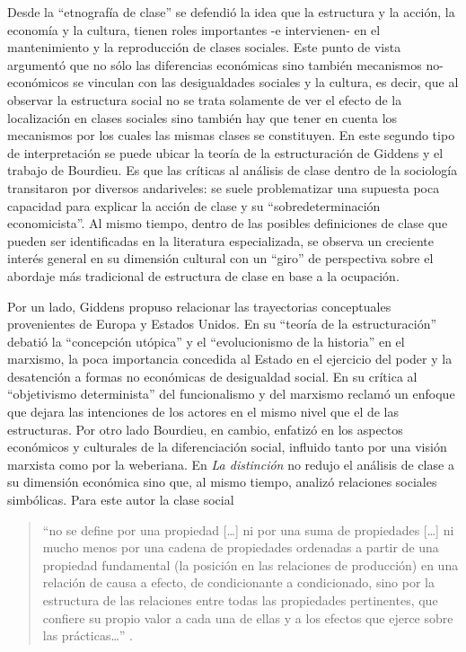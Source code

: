 \documentclass[
]{book}
\begin{document}
Desde la ``etnografía de clase'' se defendió la idea que la estructura y la acción, la economía y la cultura, tienen roles importantes -e intervienen- en el mantenimiento y la reproducción de clases sociales. Este punto de vista argumentó que no sólo las diferencias económicas sino también mecanismos no-económicos se vinculan con las desigualdades sociales y la cultura, es decir, que al observar la estructura social no se trata solamente de ver el efecto de la localización en clases sociales sino también hay que tener en cuenta los mecanismos por los cuales las mismas clases se constituyen. En este segundo tipo de interpretación se puede ubicar la teoría de la estructuración de Giddens y el trabajo de Bourdieu. Es que las críticas al análisis de clase dentro de la sociología transitaron por diversos andariveles: se suele problematizar una supuesta poca capacidad para explicar la acción de clase y su ``sobredeterminación economicista''. Al mismo tiempo, dentro de las posibles definiciones de clase que pueden ser identificadas en la literatura especializada, se observa un creciente interés general en su dimensión cultural \citep[p.~16]{Crompton2008} con un ``giro'' de perspectiva sobre el abordaje más tradicional de estructura de clase en base a la ocupación.

Por un lado, Giddens \citeyearpar{Giddens1998} propuso relacionar las trayectorias conceptuales provenientes de Europa y Estados Unidos. En su ``teoría de la estructuración'' debatió la ``concepción utópica'' y el ``evolucionismo de la historia'' en el marxismo, la poca importancia concedida al Estado en el ejercicio del poder y la desatención a formas no económicas de desigualdad social. En su crítica al ``objetivismo determinista'' del funcionalismo y del marxismo reclamó un enfoque que dejara las intenciones de los actores en el mismo nivel que el de las estructuras. Por otro lado Bourdieu, en cambio, enfatizó en los aspectos económicos y culturales de la diferenciación social, influido tanto por una visión marxista como por la weberiana. En \emph{La distinción} \citeyearpar{Bourdieu2012} no redujo el análisis de clase a su dimensión económica sino que, al mismo tiempo, analizó relaciones sociales simbólicas. Para este autor la clase social

\begin{quote}
``no se define por una propiedad {[}\ldots{]} ni por una suma de propiedades {[}\ldots{]} ni mucho menos por una cadena de propiedades ordenadas a partir de una propiedad fundamental (la posición en las relaciones de producción) en una relación de causa a efecto, de condicionante a condicionado, sino por la estructura de las relaciones entre todas las propiedades pertinentes, que confiere su propio valor a cada una de ellas y a los efectos que ejerce sobre las prácticas\ldots{}'' \citep[p.~121]{Bourdieu2012}.
\end{quote}
\end{document}
